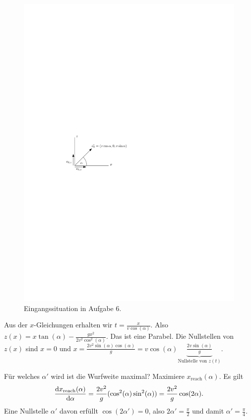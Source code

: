 	\begin{figure}[h]
		\centering
		\includegraphics{figures/ueb3/aufgabe6}
		\caption{Eingangssituation in Aufgabe 6.}
		\label{fig:ueb3_aufgabe6}
	\end{figure}
	
	Aus der $x$-Gleichungen erhalten wir $t = \frac{x}{v \cos(\alpha)}$. Also $z(x) = x \tan(\alpha) - \frac{gx^2}{2 v^2 \cos^2(\alpha)}$. Das ist eine Parabel. Die Nullstellen von $z(x)$ sind $x = 0$ und $x = \frac{2 v^2 \sin(\alpha) \cos(\alpha)}{g} = v \cos(\alpha) \underbrace{\frac{2 v \sin(\alpha)}{g}}_{\text{Nullstelle von $z(t)$}}$.
	
	Für welches $\alpha'$ wird ist die Wurfweite maximal? Maximiere $x_{\text{reach}}(\alpha)$. Es gilt
	\[
		\frac{\mathrm{d}x_{\text{reach}}(\alpha)}{\mathrm{d}\alpha} = \frac{2v^2}{g} (\cos^2(\alpha) \sin^2(\alpha)) = \frac{2 v^2}{g} \cos(2 \alpha)
		\text{.}
	\]
	Eine Nullstelle $\alpha'$ davon erfüllt $\cos(2 \alpha') = 0$, also $2 \alpha' = \frac{\pi}{2}$ und damit $\alpha' = \frac{\pi}{4}$.

